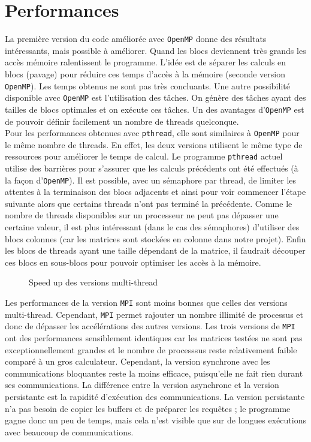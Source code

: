\section{Performances} %
\label{sec:perf}

La première version du code améliorée avec \texttt{OpenMP} donne des résultats intéressants, mais possible à améliorer. Quand les blocs deviennent très grands les accès mémoire ralentissent le programme. L'idée est de séparer les calculs en blocs (pavage) pour réduire ces temps d'accès à la mémoire (seconde version \texttt{OpenMP}). Les temps obtenus ne sont pas très concluants. Une autre possibilité disponible avec \texttt{OpenMP} est l'utilisation des tâches. On génère des tâches ayant des tailles de blocs optimales et on exécute ces tâches. Un des avantages d'\texttt{OpenMP} est de pouvoir définir facilement un nombre de threads quelconque.\\

Pour les performances obtenues avec \texttt{pthread}, elle sont similaires à \texttt{OpenMP} pour le même nombre de threads. En effet, les deux versions utilisent le même type de ressources pour améliorer le temps de calcul. Le programme \texttt{pthread} actuel utilise des barrières pour s'assurer que les calculs précédents ont été effectués (à la façon d'\texttt{OpenMP}). Il est possible, avec un sémaphore par thread, de limiter les attentes à la terminaison des blocs adjacents et ainsi pour voir commencer l'étape suivante alors que certains threads n'ont pas terminé la précédente. Comme le nombre de threads disponibles sur un processeur ne peut pas dépasser une certaine valeur, il est plus intéressant (dans le cas des sémaphores) d'utiliser des blocs colonnes (car les matrices sont stockées en colonne dans notre projet). Enfin les blocs de threads ayant une taille dépendant de la matrice, il faudrait découper ces blocs en sous-blocs pour pouvoir optimiser les accès à la mémoire.

\begin{figure}[H]
\centering
\caption{Speed up des versions multi-thread}
\label{fig:sp-size}
\end{figure}

Les performances de la version \texttt{MPI} sont moins bonnes que celles des versions multi-thread. Cependant, \texttt{MPI} permet rajouter un nombre illimité de processus et donc de dépasser les accélérations des autres versions. Les trois versions de \texttt{MPI} ont des performances sensiblement identiques car les matrices testées ne sont pas exceptionnellement grandes et le nombre de processsus reste relativement faible comparé à un gros calculateur. Cependant, la version synchrone avec les communications bloquantes reste la moins efficace, puisqu'elle ne fait rien durant ses communications. La différence entre la version asynchrone et la version persistante est la rapidité d'exécution des communications. La version persistante n'a pas besoin de copier les buffers et de préparer les requêtes ; le programme gagne donc un peu de temps, mais cela n'est visible que sur de longues exécutions avec beaucoup de communications.


